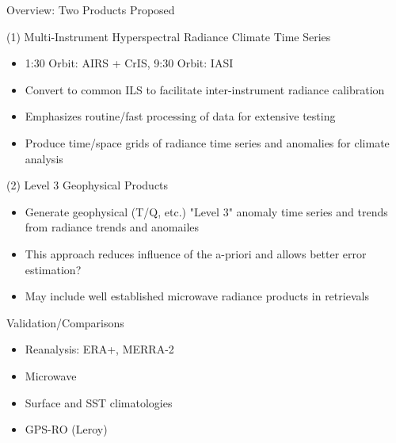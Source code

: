 \documentclass[10pt,t]{beamer}
\begin{document}
\begin{frame}[shrink=20,label={sec:org06d3c5c}]{Overview:  Two Products Proposed}
\vspace{-0.1in}
\begin{block}{(1) Multi-Instrument Hyperspectral Radiance Climate Time Series}
\begin{itemize}
\item 1:30 Orbit: AIRS + CrIS, 9:30 Orbit: IASI
\item Convert to common ILS to facilitate inter-instrument radiance calibration
\item Emphasizes routine/fast processing of data for extensive testing
\item Produce time/space grids of radiance time series and anomalies for climate analysis
\end{itemize}
\end{block}

\begin{block}{(2) Level 3 Geophysical Products}
\begin{itemize}
\item Generate geophysical (T/Q, etc.) "Level 3" anomaly time series and trends from radiance trends and anomailes
\item This approach reduces influence of the a-priori and allows better error estimation?
\item May include well established microwave radiance products in retrievals
\end{itemize}
\end{block}

\begin{block}{Validation/Comparisons}
\begin{itemize}
\item Reanalysis: ERA+, MERRA-2
\item Microwave
\item Surface and SST climatologies
\item GPS-RO (Leroy)
\end{itemize}
\end{block}
\end{frame}
\end{document}
